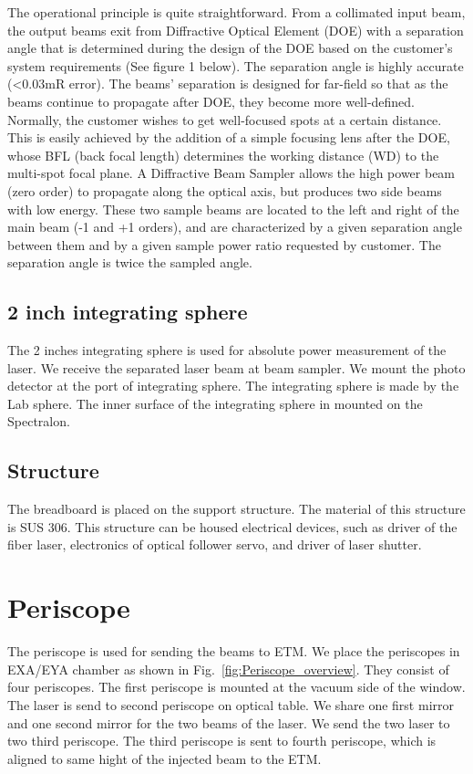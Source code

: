 The operational principle is quite straightforward. From a collimated input beam, the output beams exit from Diffractive Optical Element (DOE) with a separation angle that is determined during the design of the DOE based on the customer's system requirements (See figure 1 below). The separation angle is highly accurate (<0.03mR error). The beams' separation is designed for far-field so that as the beams continue to propagate after DOE, they become more well-defined.
Normally, the customer wishes to get well-focused spots at a certain distance. This is easily achieved by the addition of a simple focusing lens after the DOE, whose BFL (back focal length) determines the working distance (WD) to the multi-spot focal plane.
A Diffractive Beam Sampler allows the high power beam (zero order) to propagate along the optical axis, but produces two side beams with low energy. These two sample beams are located to the left and right of the main beam (-1 and +1 orders), and are characterized by a given separation angle between them and by a given sample power ratio requested by customer. The separation angle is twice the sampled angle.

\subsection{2 inch integrating sphere}
The 2 inches integrating sphere is used for absolute power measurement of the laser. We receive the separated laser beam at beam sampler. We mount the photo detector at the port of integrating sphere. The integrating sphere is made by the Lab sphere. The inner surface of the integrating sphere in mounted on the Spectralon.

\subsection{Structure}
The breadboard is placed on the support structure. The material of this structure is SUS 306. This structure can be housed electrical devices, such as driver of the fiber laser, electronics of optical follower servo, and driver of laser shutter. 

\section{Periscope}
The periscope is used for sending the beams to ETM. We place the periscopes in EXA/EYA chamber as shown in Fig.~\ref{fig:Periscope_overview}.
They consist of four periscopes. The first periscope is mounted at the vacuum side of the window. The laser is send to second periscope on optical table. We share one first mirror and one second mirror for the two beams of the laser. We send the two laser to two third periscope. The third periscope is sent to fourth periscope, which is aligned to same hight of the injected beam to the ETM. 

